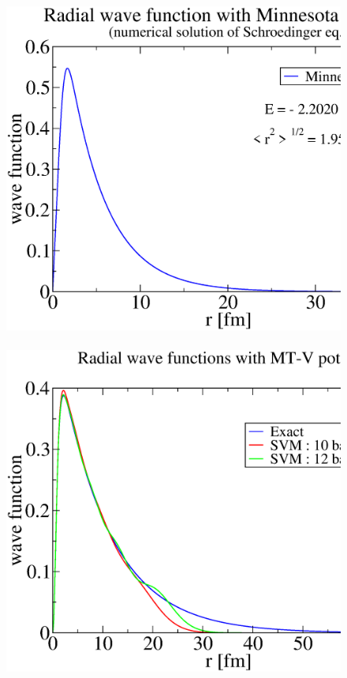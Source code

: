 \documentclass[12pt,a4paper,titlepage]{jarticle}
\begin{document}
\begin{figure}[H]
\begin{center}
\includegraphics[width=140mm,height=110mm]{wf_numeric4.eps}
\end{center}
\end{figure}

\begin{figure}[H]
\begin{center}
\includegraphics[width=140mm,height=110mm]{wf_SVM.eps}
\end{center}
\end{figure}
\end{document}
